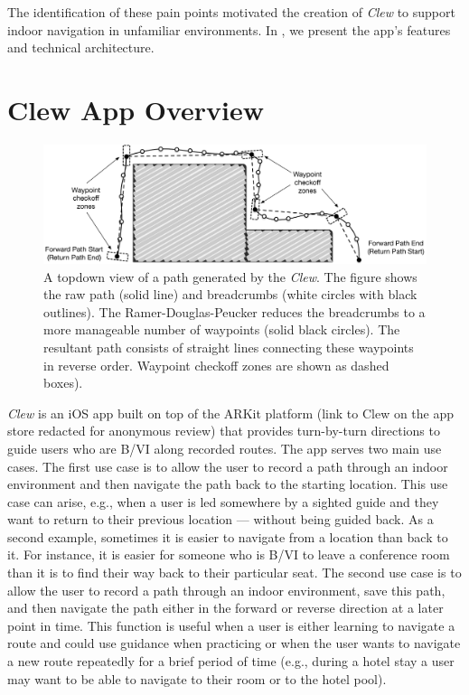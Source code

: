 \documentclass[chi_draft]{sigchi}
\newcommand{\BVI}{B/VI\xspace}
\begin{document}
The identification of these pain points motivated the creation of \emph{Clew} to support indoor navigation in unfamiliar environments.  In \emph{}, we present the app's features and technical architecture.%

\section{Clew App Overview}\label{sec:clewoverview}

\begin{figure}
\begin{center}
\includegraphics[width=\linewidth]{Figures/samplepath}
\end{center}
\caption{A topdown view of a path generated by the \emph{Clew}.  The figure shows the raw path (solid line) and breadcrumbs (white circles with black outlines).  The Ramer-Douglas-Peucker reduces the breadcrumbs to a more manageable number of waypoints (solid black circles).  The resultant path consists of straight lines connecting these waypoints in reverse order.  Waypoint checkoff zones are shown as dashed boxes).\label{fig:samplepath}}
\end{figure}

\emph{Clew} is an iOS app built on top of the ARKit platform (link to Clew on the app store redacted for anonymous review) that provides turn-by-turn directions to guide users who are \BVI along recorded routes.  The app serves two main use cases.  The first use case is to allow the user to record a path through an indoor environment and then navigate the path back to the starting location.  This use case can arise, e.g., when a user is led somewhere by a sighted guide and they want to return to their previous location --- without being guided back.  As a second example, sometimes it is easier to navigate from a location than back to it.  For instance, it is easier for someone who is \BVI to leave a conference room than it is to find their way back to their particular seat.  The second use case is to allow the user to record a path through an indoor environment, save this path, and then navigate the path either in the forward or reverse direction at a later point in time.  This function is useful when a user is either learning to navigate a route and could use guidance when practicing or when the user wants to navigate a new route repeatedly for a brief period of time (e.g., during a hotel stay a user may want to be able to navigate to their room or to the hotel pool).
\end{document}
